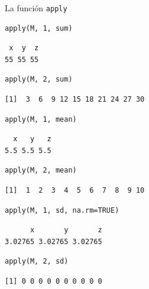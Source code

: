 \documentclass[xcolor={usenames,svgnames,dvipsnames}]{beamer}
\begin{document}
\begin{frame}[fragile,label=sec-2-2-9]{La función \texttt{apply}}
 \lstset{language=R,label= ,caption= ,numbers=none}
\begin{lstlisting}
apply(M, 1, sum)
\end{lstlisting}

\begin{verbatim}
 x  y  z 
55 55 55
\end{verbatim}

\lstset{language=R,label= ,caption= ,numbers=none}
\begin{lstlisting}
apply(M, 2, sum)
\end{lstlisting}

\begin{verbatim}
[1]  3  6  9 12 15 18 21 24 27 30
\end{verbatim}

\lstset{language=R,label= ,caption= ,numbers=none}
\begin{lstlisting}
apply(M, 1, mean)
\end{lstlisting}

\begin{verbatim}
  x   y   z 
5.5 5.5 5.5
\end{verbatim}

\lstset{language=R,label= ,caption= ,numbers=none}
\begin{lstlisting}
apply(M, 2, mean)
\end{lstlisting}

\begin{verbatim}
[1]  1  2  3  4  5  6  7  8  9 10
\end{verbatim}

\lstset{language=R,label= ,caption= ,numbers=none}
\begin{lstlisting}
apply(M, 1, sd, na.rm=TRUE)
\end{lstlisting}

\begin{verbatim}
      x       y       z 
3.02765 3.02765 3.02765
\end{verbatim}

\lstset{language=R,label= ,caption= ,numbers=none}
\begin{lstlisting}
apply(M, 2, sd)
\end{lstlisting}

\begin{verbatim}
[1] 0 0 0 0 0 0 0 0 0 0
\end{verbatim}
\end{frame}
\end{document}
